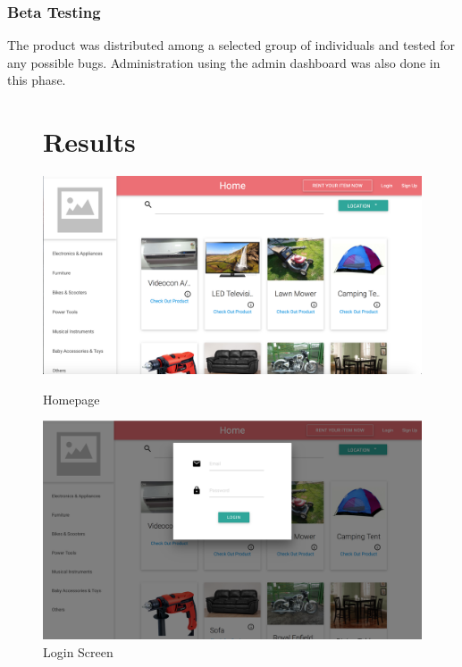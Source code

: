 \documentclass[11pt]{report}
\begin{document}
\subsubsection{Beta Testing}
The product was distributed among a selected group of individuals and tested for any possible
bugs. Administration using the admin dashboard was also done in this phase.
\vspace{5.0in}
\begin{figure}[h]
\section{Results}
  \centering
    \includegraphics[width=6in]{homepage.png} 
	\caption{Homepage}
\vspace{0.5in}
  \centering
    \includegraphics[width=6in]{login.png} 
	\caption{Login Screen}
	\end{figure}
\end{document}
